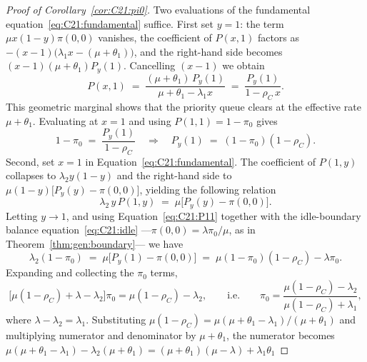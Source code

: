 \begin{proof}[Proof of Corollary~\ref{cor:C21:pi0}]
    Two evaluations of the fundamental equation~\eqref{eq:C21:fundamental} suffice. First set $y=1$: the term $\mu x(1-y)\pi(0,0)$ vanishes, the coefficient of $P(x,1)$ factors as $-(x-1)\bigl(\lambda_1 x-(\mu+\theta_1)\bigr)$, and the right-hand side becomes $(x-1)(\mu+\theta_1)P_y(1)$. Cancelling $(x-1)$ we obtain
    \begin{equation}
        P(x,1) \;=\; \frac{(\mu+\theta_1)\,P_y(1)}{\mu+\theta_1-\lambda_1 x}
                \;=\; \frac{P_y(1)}{1-\rho_C\,x}.
        \label{eq:C21:Px1}
    \end{equation}
    This geometric marginal shows that the priority queue clears at the effective rate
    $\mu+\theta_1$. Evaluating at $x=1$ and using $P(1,1)=1-\pi_0$ gives
    \begin{equation}
        1-\pi_0 \;=\; \frac{P_y(1)}{1-\rho_C}
        \quad\Longrightarrow\quad
        P_y(1) \;=\; (1-\pi_0)(1-\rho_C).
        \label{eq:C21:P11}
    \end{equation}
    Second, set $x=1$ in Equation~\eqref{eq:C21:fundamental}. The coefficient of $P(1,y)$ collapses to $\lambda_2 y(1-y)$ and the right-hand side to $\mu(1-y)\bigl[P_y(y)-\pi(0,0)\bigr]$, yielding the following relation
    \begin{equation}
        \lambda_2\,y\,P(1,y) \;=\; \mu\bigl[P_y(y)-\pi(0,0)\bigr].
        \label{eq:C21:P1y}
    \end{equation}
    Letting $y\to1$, and using Equation~\eqref{eq:C21:P11} together with the idle-boundary balance equation~\eqref{eq:C21:idle} ---$\pi(0,0)=\lambda\pi_0/\mu$, as in Theorem~\ref{thm:gen:boundary}--- we have
    \begin{equation*}
        \lambda_2(1-\pi_0) \;=\; \mu\bigl[P_y(1)-\pi(0,0)\bigr]
        \;=\; \mu(1-\pi_0)(1-\rho_C) - \lambda\pi_0.
    \end{equation*}
    Expanding and collecting the $\pi_0$ terms,
    \begin{equation*}
        \bigl[\mu(1-\rho_C)+\lambda-\lambda_2\bigr]\pi_0 = \mu(1-\rho_C)-\lambda_2,
        \qquad\text{i.e.}\qquad
        \pi_0 = \frac{\mu(1-\rho_C)-\lambda_2}{\mu(1-\rho_C)+\lambda_1},
    \end{equation*}
    where $\lambda-\lambda_2=\lambda_1$. Substituting $\mu(1-\rho_C)=\mu(\mu+\theta_1-\lambda_1)/(\mu+\theta_1)$ and multiplying numerator and denominator by $\mu+\theta_1$, the numerator becomes
    $\mu(\mu+\theta_1-\lambda_1)-\lambda_2(\mu+\theta_1)=(\mu+\theta_1)(\mu-\lambda)+\lambda_1\theta_1$

\end{proof}
